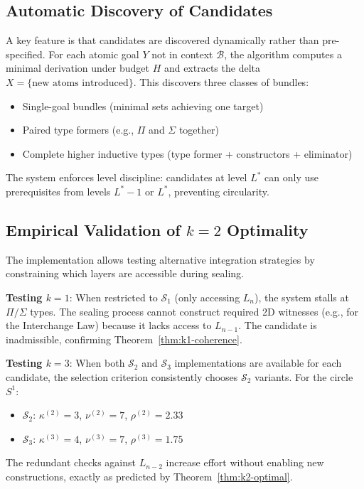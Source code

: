 \documentclass[11pt]{article}
\theoremstyle{definition}
\theoremstyle{plain}
\theoremstyle{remark}
\begin{document}
\subsection{Automatic Discovery of Candidates}

A key feature is that candidates are discovered dynamically rather than pre-specified. For each atomic goal $Y$ not in context $\mathcal{B}$, the algorithm computes a minimal derivation under budget $H$ and extracts the delta $X = \{\text{new atoms introduced}\}$. This discovers three classes of bundles:
\begin{itemize}
\item Single-goal bundles (minimal sets achieving one target)
\item Paired type formers (e.g., $\Pi$ and $\Sigma$ together)
\item Complete higher inductive types (type former + constructors + eliminator)
\end{itemize}

The system enforces level discipline: candidates at level $L^*$ can only use prerequisites from levels $L^* - 1$ or $L^*$, preventing circularity.

\subsection{Empirical Validation of $k=2$ Optimality}

The implementation allows testing alternative integration strategies by constraining which layers are accessible during sealing.

\textbf{Testing $k=1$}: When restricted to $\mathcal{S}_1$ (only accessing $L_n$), the system stalls at $\Pi/\Sigma$ types. The sealing process cannot construct required 2D witnesses (e.g., for the Interchange Law) because it lacks access to $L_{n-1}$. The candidate is inadmissible, confirming Theorem~\ref{thm:k1-coherence}.

\textbf{Testing $k=3$}: When both $\mathcal{S}_2$ and $\mathcal{S}_3$ implementations are available for each candidate, the selection criterion consistently chooses $\mathcal{S}_2$ variants. For the circle $S^1$:
\begin{itemize}
\item $\mathcal{S}_2$: $\kappa^{(2)} = 3$, $\nu^{(2)} = 7$, $\rho^{(2)} = 2.33$
\item $\mathcal{S}_3$: $\kappa^{(3)} = 4$, $\nu^{(3)} = 7$, $\rho^{(3)} = 1.75$
\end{itemize}
The redundant checks against $L_{n-2}$ increase effort without enabling new constructions, exactly as predicted by Theorem~\ref{thm:k2-optimal}.
\end{document}
